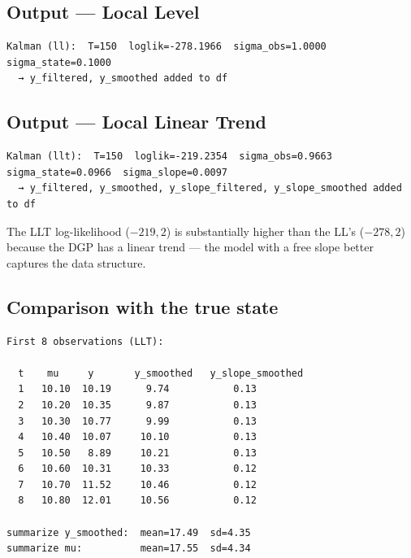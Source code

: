 \subsection*{Output — Local Level}

\begin{lstlisting}[language={}, basicstyle=\ttfamily\small, frame=none,
  numbers=none, backgroundcolor=\color{codbg}]
Kalman (ll):  T=150  loglik=-278.1966  sigma_obs=1.0000  sigma_state=0.1000
  → y_filtered, y_smoothed added to df
\end{lstlisting}

\subsection*{Output — Local Linear Trend}

\begin{lstlisting}[language={}, basicstyle=\ttfamily\small, frame=none,
  numbers=none, backgroundcolor=\color{codbg}]
Kalman (llt):  T=150  loglik=-219.2354  sigma_obs=0.9663  sigma_state=0.0966  sigma_slope=0.0097
  → y_filtered, y_smoothed, y_slope_filtered, y_slope_smoothed added to df
\end{lstlisting}

The LLT log-likelihood ($-219{,}2$) is substantially higher than the LL's
($-278{,}2$) because the DGP has a linear trend — the model with a free slope
better captures the data structure.

\subsection*{Comparison with the true state}

\begin{lstlisting}[language={}, basicstyle=\ttfamily\small, frame=none,
  numbers=none, backgroundcolor=\color{codbg}]
First 8 observations (LLT):

  t    mu     y       y_smoothed   y_slope_smoothed
  1   10.10  10.19      9.74           0.13
  2   10.20  10.35      9.87           0.13
  3   10.30  10.77      9.99           0.13
  4   10.40  10.07     10.10           0.13
  5   10.50   8.89     10.21           0.13
  6   10.60  10.31     10.33           0.12
  7   10.70  11.52     10.46           0.12
  8   10.80  12.01     10.56           0.12

summarize y_smoothed:  mean=17.49  sd=4.35
summarize mu:          mean=17.55  sd=4.34
\end{lstlisting}

